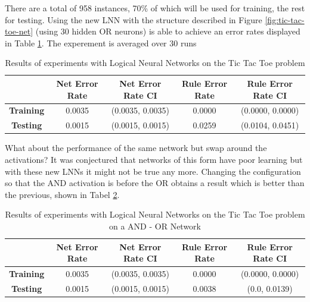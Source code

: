 There are a total of 958 instances, 70\% of which will be used for training, the rest for testing. Using the new LNN with the structure described in Figure \ref{fig:tic-tac-toe-net} (using 30 hidden OR neurons) is able to achieve an error rates displayed in Table \ref{tab:tic-tac-toe-lnn-peformance-results}. The experement is averaged over 30 runs

\begin{table}[H]
	\begin{center}
		\begin{tabular}{| c | c | c | c | c |}
			\hline
			\textbf{} & \textbf{Net Error Rate} & \textbf{Net Error Rate CI} & \textbf{Rule Error Rate} & \textbf{Rule Error Rate CI}\\
			\hline
			\hline
			\textbf{Training} & 0.0035 & (0.0035, 0.0035) & 0.0000 & (0.0000, 0.0000)\\
			\textbf{Testing} & 0.0015 & (0.0015, 0.0015) & 0.0259 & (0.0104, 0.0451)\\
			\hline
		\end{tabular}
	\end{center}
	\caption{Results of experiments with Logical Neural Networks on the Tic Tac Toe problem}
	\label{tab:tic-tac-toe-lnn-peformance-results}
\end{table}

What about the performance of the same network but swap around the activations? It was conjectured that networks of this form have poor learning \cite{LearningLogicalActivations} but with these new LNNs it might not be true any more. Changing the configuration so that the AND activation is before the OR obtains a result which is better than the previous, shown in Tabel \ref{tab:tic-tac-toe-lnn-peformance-results-and-or}.\\

\begin{table}[H]
	\begin{center}
		\begin{tabular}{| c | c | c | c | c |}
			\hline
			\textbf{} & \textbf{Net Error Rate} & \textbf{Net Error Rate CI} & \textbf{Rule Error Rate} & \textbf{Rule Error Rate CI}\\
			\hline
			\hline
			\textbf{Training} & 0.0035 & (0.0035, 0.0035) & 0.0000 & (0.0000, 0.0000)\\
			\textbf{Testing} & 0.0015 & (0.0015, 0.0015) & 0.0038 & (0.0, 0.0139)\\
			\hline
		\end{tabular}
	\end{center}
	\caption{Results of experiments with Logical Neural Networks on the Tic Tac Toe problem on a AND - OR Network}
	\label{tab:tic-tac-toe-lnn-peformance-results-and-or}
\end{table}

